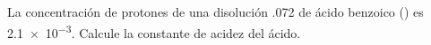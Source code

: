La concentración de protones de una disolución \SI{,072}{\Molar} de ácido benzoico () es \num{2,1e-3}. Calcule la constante de acidez del ácido.
